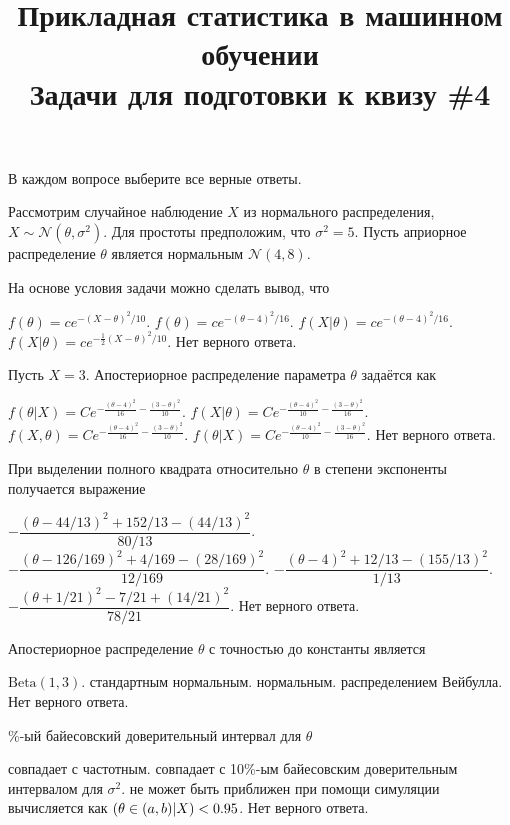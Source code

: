 \documentclass[10pt, a4paper]{exam}
\title{{\normalsize Прикладная статистика в машинном обучении} \\ \vspace{0.5em} Задачи для подготовки к квизу \#4}
\author{\rule{15cm}{0.4pt}}
\let\P\relax
\DeclareMathOperator{\P}{\mathbb{P}}
\begin{document}
	
	\maketitle
	
	\begin{center}
		В каждом вопросе выберите все верные ответы.
	\end{center}
	
	Рассмотрим случайное наблюдение $X$ из нормального распределения, $X \sim \mathcal{N}(\theta, \sigma^2)$. Для простоты предположим, что $\sigma^2 = 5$. Пусть априорное распределение $\theta$ является нормальным $\mathcal{N}(4, 8)$. 
	
	\begin{questions}
		\question На основе условия задачи можно сделать вывод, что
		\begin{choices}
			\choice $f(\theta) = ce^{-(X-\theta)^2/10}$.
			\CorrectChoice $f(\theta) = ce^{-(\theta-4)^2/16}$.
			\choice $f(X | \theta) = ce^{-(\theta-4)^2/16}$.
			\choice $f(X|\theta) = ce^{-\frac{1}{2}(X-\theta)^2/10}$.
			\choice Нет верного ответа.
		\end{choices}
	
		\question Пусть $X = 3$. Апостериорное распределение параметра $\theta$ задаётся как
		\begin{choices}
			\CorrectChoice $f(\theta | X) = Ce^{-\frac{(\theta - 4)^2}{16} - \frac{(3-\theta)^2}{10}}$.
			\choice $f(X | \theta) = Ce^{-\frac{(\theta - 4)^2}{10} - \frac{(3-\theta)^2}{16}}$.
			\choice $f(X, \theta) = Ce^{-\frac{(\theta - 4)^2}{16} - \frac{(3-\theta)^2}{10}}$.
			\choice $f(\theta | X) = Ce^{-\frac{(\theta - 4)^2}{10} - \frac{(3-\theta)^2}{16}}$.
			\choice Нет верного ответа.
		\end{choices}
		
		\question При выделении полного квадрата относительно $\theta$ в степени экспоненты получается выражение
		\begin{choices}
			\CorrectChoice $-\dfrac{(\theta - 44/13)^2 + 152/13 - (44/13)^2}{80/13}$.
			\choice $-\dfrac{(\theta - 126/169)^2 + 4/169 - (28/169)^2}{12/169}$.
			\choice $-\dfrac{(\theta - 4)^2 + 12/13 - (155/13)^2}{1/13}$.
			\choice $-\dfrac{(\theta + 1/21)^2 - 7/21 + (14/21)^2}{78/21}$.
			\choice Нет верного ответа.
		\end{choices}
		
		\question Апостериорное распределение $\theta$ с точностью до константы является
		\begin{choices}
			\choice $\mathrm{Beta}(1, 3)$.
			\choice стандартным нормальным.
			\CorrectChoice нормальным.
			\choice распределением Вейбулла.
			\choice Нет верного ответа.
		\end{choices}
	
		\%-ый байесовский доверительный интервал для $\theta$
		\begin{choices}
			\choice совпадает с частотным.
			\choice совпадает с 10\%-ым байесовским доверительным интервалом для $\sigma^2$.
			\choice не может быть приближен при помощи симуляции
			\choice вычисляется как $\P(\theta \in (a, b) | X) < 0.95$.
			 \CorrectChoice Нет верного ответа.
		\end{choices}
	\end{questions}
\end{document}
